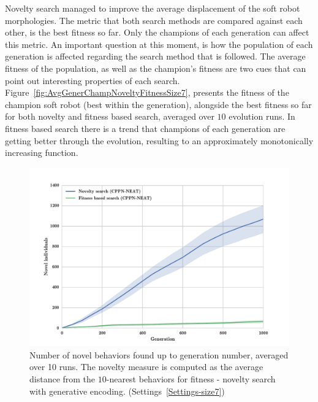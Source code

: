 Novelty search managed to improve the average displacement of the soft robot morphologies. The metric that both search methods are compared against each other, is the best fitness so far. Only the champions of each generation can affect this metric. An important question at this moment, is how the population of each generation is affected regarding the search method that is followed. The average fitness of the population, as well as the champion's fitness are two cues that can point out interesting properties of each search. Figure~\ref{fig:AvgGenerChampNoveltyFitnessSize7}, presents the fitness of the champion soft robot (best within the generation), alongside the best fitness so far for both novelty and fitness based search, averaged over $10$ evolution runs. In fitness based search there is a trend that champions of each generation are getting better through the evolution, resulting to an approximately monotonically increasing function. 
\begin{figure}[t!]
\centering
\includegraphics[width=1.0\textwidth]{../Figures/Results/novelIndividualsFitNovComp.pdf}
\caption{Number of novel behaviors found up to generation number, averaged over 10 runs. The novelty measure is computed as the average distance from the $10$-nearest behaviors for fitness - novelty search with generative encoding. (Settings~\ref{Settings-size7})}
\label{fig:novelIndividualsFitNovComp}
\end{figure}
